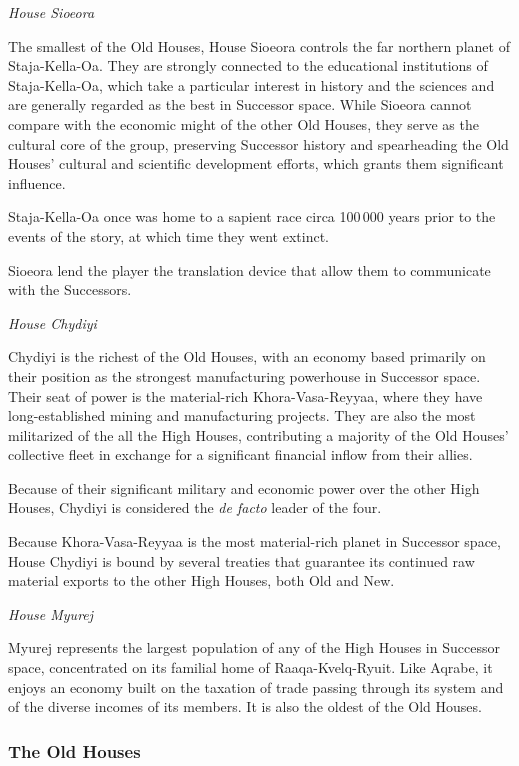 \documentclass[11pt]{report}
\begin{document}
    \noindent
    \emph{House Sioeora}

    The smallest of the Old Houses, House Sioeora controls the far northern planet of Staja-Kella-Oa. They are strongly connected to the educational institutions of Staja-Kella-Oa, which take a particular interest in history and the sciences and are generally regarded as the best in Successor space. While Sioeora cannot compare with the economic might of the other Old Houses, they serve as the cultural core of the group, preserving Successor history and spearheading the Old Houses' cultural and scientific development efforts, which grants them significant influence.

    Staja-Kella-Oa once was home to a sapient race circa 100\,000 years prior to the events of the story, at which time they went extinct.

    Sioeora lend the player the translation device that allow them to communicate with the Successors.
    \bigskip

    \noindent
    \emph{House Chydiyi}

    Chydiyi is the richest of the Old Houses, with an economy based primarily on their position as the strongest manufacturing powerhouse in Successor space. Their seat of power is the material-rich Khora-Vasa-Reyyaa, where they have long-established mining and manufacturing projects. They are also the most militarized of the all the High Houses, contributing a majority of the Old Houses' collective fleet in exchange for a significant financial inflow from their allies.

    Because of their significant military and economic power over the other High Houses, Chydiyi is considered the \emph{de facto} leader of the four.

    Because Khora-Vasa-Reyyaa is the most material-rich planet in Successor space, House Chydiyi is bound by several treaties that guarantee its continued raw material exports to the other High Houses, both Old and New.
    \bigskip

    \noindent
    \emph{House Myurej}

    Myurej represents the largest population of any of the High Houses in Successor space, concentrated on its familial home of Raaqa-Kvelq-Ryuit. Like Aqrabe, it enjoys an economy built on the taxation of trade passing through its system and of the diverse incomes of its members. It is also the oldest of the Old Houses. 
    \bigskip

    \subsubsection{The Old Houses}
\end{document}
